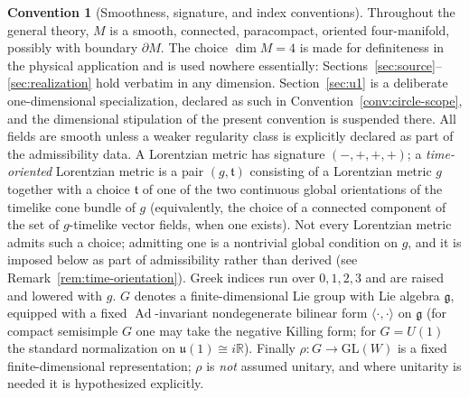 \documentclass[11pt,a4paper]{article}
\theoremstyle{plain}
\theoremstyle{definition}
\newtheorem{convention}[theorem]{Convention}
\theoremstyle{remark}
\newcommand{\Real}{\mathbb{R}}
\newcommand{\gfrak}{\mathfrak{g}}
\newcommand{\Ad}{\operatorname{Ad}}
\begin{document}
\begin{convention}[Smoothness, signature, and index conventions]
\label{conv:basic}
Throughout the general theory, $M$ is a smooth, connected, paracompact, oriented four-manifold,
possibly with boundary $\partial M$. The choice $\dim M=4$ is made for definiteness in the physical
application and is used nowhere essentially: Sections~\ref{sec:source}--\ref{sec:realization} hold
verbatim in any dimension. Section~\ref{sec:u1} is a deliberate one-dimensional specialization,
declared as such in Convention~\ref{conv:circle-scope}, and the dimensional stipulation of the
present convention is suspended there. All fields are smooth unless a weaker regularity class is explicitly
declared as part of the admissibility data. A Lorentzian metric has signature $(-,+,+,+)$; a
\emph{time-oriented} Lorentzian metric is a pair $(g,\mathfrak{t})$ consisting of a Lorentzian
metric $g$ together with a choice $\mathfrak{t}$ of one of the two continuous global
orientations of the timelike cone bundle of $g$ (equivalently, the choice of a connected
component of the set of $g$-timelike vector fields, when one exists). Not every Lorentzian
metric admits such a choice; admitting one is a nontrivial global condition on $g$, and it is
imposed below as part of admissibility rather than derived
(see Remark~\ref{rem:time-orientation}). Greek indices run over $0,1,2,3$ and are raised and
lowered with $g$. $G$ denotes a finite-dimensional Lie group with Lie algebra $\gfrak$, equipped
with a fixed $\Ad$-invariant nondegenerate bilinear form $\langle\cdot,\cdot\rangle$ on $\gfrak$
(for compact semisimple $G$ one may take the negative Killing form; for $G=U(1)$ the standard
normalization on $\mathfrak{u}(1)\cong i\Real$). Finally $\rho\colon G\to \mathrm{GL}(W)$ is a
fixed finite-dimensional representation; $\rho$ is \emph{not} assumed unitary, and where
unitarity is needed it is hypothesized explicitly.
\end{convention}
\end{document}
